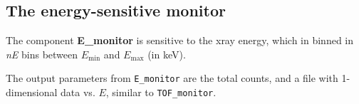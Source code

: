 \subsection*{The energy-sensitive monitor} \label{s:E_monitor}
The component \textbf{E\_monitor} is sensitive to
the xray energy, which in binned in \textit{nE} bins between
$E_\mathrm{min}$ and $E_\mathrm{max}$ (in keV).

The output parameters from \texttt{E\_monitor} are the total counts,
and a file with 1-dimensional data vs. $E$, similar to \texttt{TOF\_monitor}.

